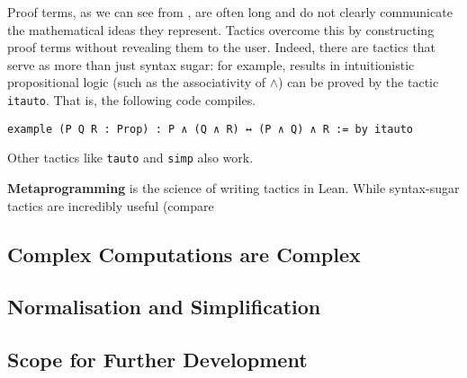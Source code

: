 Proof terms, as we can see from , are often long and do not clearly communicate the mathematical ideas they represent. Tactics overcome this by constructing proof terms without revealing them to the user. Indeed, there are tactics that serve as more than just syntax sugar: for example, results in intuitionistic propositional logic (such as the associativity of $\land$) can be proved by the tactic \lstinline|itauto|. That is, the following code compiles.


\begin{lstlisting}[caption=A one-line tactic proof for the associativity of $\land$, label=Ch5:Listing:And_assoc_itauto]
example (P Q R : Prop) : P ∧ (Q ∧ R) ↔ (P ∧ Q) ∧ R := by itauto
\end{lstlisting}

Other tactics like \lstinline|tauto| and \lstinline|simp| also work.

\textbf{Metaprogramming} is the science of writing tactics in Lean. While syntax-sugar tactics are incredibly useful (compare 

\subsection{Complex Computations are Complex}

\subsection{Normalisation and Simplification}

\subsection{Scope for Further Development}